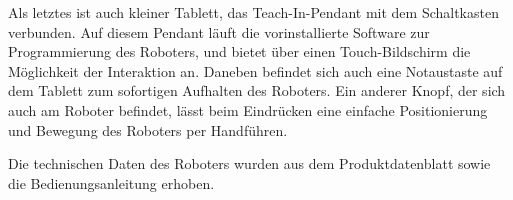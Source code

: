 Als letztes ist auch kleiner Tablett, das Teach-In-Pendant mit dem Schaltkasten verbunden. Auf diesem Pendant läuft die vorinstallierte Software zur Programmierung des Roboters, und bietet über einen Touch-Bildschirm die Möglichkeit der Interaktion an. Daneben befindet sich auch eine Notaustaste auf dem Tablett zum sofortigen Aufhalten des Roboters. Ein anderer Knopf, der sich auch am Roboter befindet, lässt beim Eindrücken eine einfache Positionierung und Bewegung des Roboters per Handführen. 

Die technischen Daten des Roboters wurden aus dem Produktdatenblatt sowie die Bedienungsanleitung erhoben.


